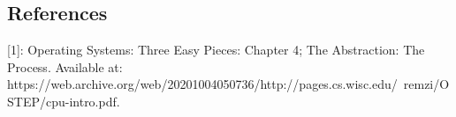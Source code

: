 \documentclass[main]{subfiles}
\begin{document}
\begin{itemize}
\end{itemize}

\subsection{References}
[1]: Operating Systems: Three Easy Pieces: Chapter 4; The Abstraction: The Process. Available at: https://web.archive.org/web/20201004050736/http://pages.cs.wisc.edu/~remzi/OSTEP/cpu-intro.pdf.

\end{document}
